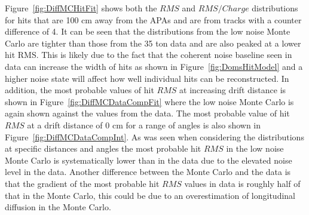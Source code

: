 Figure~\ref{fig:DiffMCHitFit} shows both the $RMS$ and $RMS/Charge$ distributions for hits that are 100 cm away from the APAs and are from tracks with a counter difference of 4. It can be seen that the distributions from the low noise Monte Carlo are tighter than those from the 35 ton data and are also peaked at a lower hit RMS. This is likely due to the fact that the coherent noise baseline seen in data can increase the width of hits as shown in Figure~\ref{fig:DomsHitModel} and a higher noise state will affect how well individual hits can be reconstructed. In addition, the most probable values of hit $RMS$ at increasing drift distance is shown in Figure~\ref{fig:DiffMCDataCompFit} where the low noise Monte Carlo is again shown against the values from the data. The most probable value of hit $RMS$ at a drift distance of 0 cm for a range of angles is also shown in Figure~\ref{fig:DiffMCDataCompInt}. As was seen when considering the distributions at specific distances and angles the most probable hit $RMS$ in the low noise Monte Carlo is systematically lower than in the data due to the elevated noise level in the data. Another difference between the Monte Carlo and the data is that the gradient of the most probable hit $RMS$ values in data is roughly half of that in the Monte Carlo, this could be due to an overestimation of longitudinal diffusion in the Monte Carlo. \\

